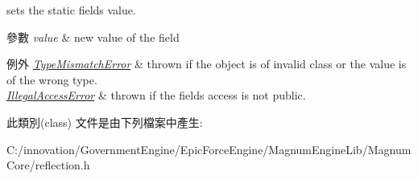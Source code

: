 sets the static field\textquotesingle{}s value. 


\begin{DoxyParams}{參數}
{\em value} & new value of the field \\
\hline
\end{DoxyParams}

\begin{DoxyExceptions}{例外}
{\em \hyperlink{classagm_1_1reflection_1_1_type_mismatch_error}{Type\+Mismatch\+Error}} & thrown if the object is of invalid class or the value is of the wrong type. \\
\hline
{\em \hyperlink{classagm_1_1reflection_1_1_illegal_access_error}{Illegal\+Access\+Error}} & thrown if the field\textquotesingle{}s access is not public. \\
\hline
\end{DoxyExceptions}


此類別(class) 文件是由下列檔案中產生\+:\begin{DoxyCompactItemize}
\item 
C\+:/innovation/\+Government\+Engine/\+Epic\+Force\+Engine/\+Magnum\+Engine\+Lib/\+Magnum\+Core/reflection.\+h\end{DoxyCompactItemize}
